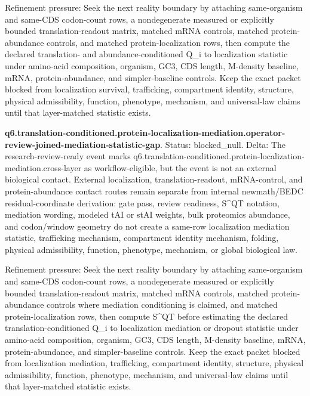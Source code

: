 Refinement pressure: Seek the next reality boundary by attaching same-organism and same-CDS codon-count rows, a nondegenerate measured or explicitly bounded translation-readout matrix, matched mRNA controls, matched protein-abundance controls, and matched protein-localization rows, then compute the declared translation- and abundance-conditioned Q\_i to localization statistic under amino-acid composition, organism, GC3, CDS length, M-density baseline, mRNA, protein-abundance, and simpler-baseline controls. Keep the exact packet blocked from localization survival, trafficking, compartment identity, structure, physical admissibility, function, phenotype, mechanism, and universal-law claims until that layer-matched statistic exists.

\textbf{q6.translation-conditioned.protein-localization-mediation.operator-review-joined-mediation-statistic-gap}. Status: blocked\_null. Delta: The research-review-ready event marks q6.translation-conditioned.protein-localization-mediation.cross-layer as workflow-eligible, but the event is not an external biological contact. External localization, translation-readout, mRNA-control, and protein-abundance contact routes remain separate from internal newmath/BEDC residual-coordinate derivation: gate pass, review readiness, S\textasciicircum{}QT notation, mediation wording, modeled tAI or stAI weights, bulk proteomics abundance, and codon/window geometry do not create a same-row localization mediation statistic, trafficking mechanism, compartment identity mechanism, folding, physical admissibility, function, phenotype, mechanism, or global biological law.

Refinement pressure: Seek the next reality boundary by attaching same-organism and same-CDS codon-count rows, a nondegenerate measured or explicitly bounded translation-readout matrix, matched mRNA controls, matched protein-abundance controls where mediation conditioning is claimed, and matched protein-localization rows, then compute S\textasciicircum{}QT before estimating the declared translation-conditioned Q\_i to localization mediation or dropout statistic under amino-acid composition, organism, GC3, CDS length, M-density baseline, mRNA, protein-abundance, and simpler-baseline controls. Keep the exact packet blocked from localization mediation, trafficking, compartment identity, structure, physical admissibility, function, phenotype, mechanism, and universal-law claims until that layer-matched statistic exists.

